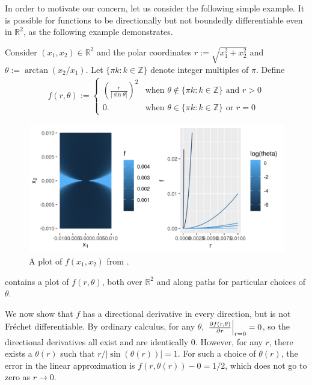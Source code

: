 In order to motivate our concern, let us consider the following simple example.
It is possible for functions to be directionally but not boundedly
differentiable even in $\mathbb{R}^2$, as the following example demonstrates.

\begin{ex}
%
Consider $(x_1, x_2) \in \mathbb{R}^2$ and the polar coordinates $r :=
\sqrt{x_1^2 + x_2^2}$ and $\theta := \arctan(x_2 / x_1)$.  Let $\{\pi k: k \in
\mathbb{Z} \}$ denote integer multiples of $\pi$.  Define
%
\begin{align*}
%
f(r, \theta) := \begin{cases}
    \left(\frac{r}{| \sin \theta |}\right)^2
        & \textrm{when } \theta \notin \{\pi k: k \in \mathbb{Z}\}
        \textrm{ and } r > 0 \\
    0. & \textrm{when } \theta \in \{\pi k: k \in \mathbb{Z}
        \} \textrm{ or }r = 0
%
\end{cases}
%
\end{align*}
%
\begin{figure}[h!]

\includegraphics[width=0.980\linewidth,height=0.490\linewidth]{static_images/pathological_r2_example.png}
\caption{A plot of $f(x_1, x_2)$ from .}
\centering
\end{figure}
%
 contains a plot of $f(r, \theta)$, both over
$\mathbb{R}^2$ and along paths for particular choices of $\theta$.

We now show that $f$ has a directional derivative in every direction, but is not
Fr{\'e}chet differentiable.  By ordinary calculus, for any $\theta$,
$\left.\frac{\partial f(r, \theta)}{\partial r}\right\vert_{r=0} = 0$, so the directional
derivatives all exist and are identically $0$.  However, for any $r$, there
exists a $\theta(r)$ such that $r / |\sin(\theta(r))| = 1$.  For such a choice
of $\theta(r)$, the error in the linear approximation is $f(r, \theta(r)) - 0 =
1/2$, which does not go to zero as $r \rightarrow 0$.

\end{ex}


